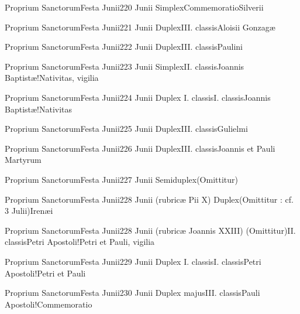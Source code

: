 \documentclass[invitatoriale-romanum.tex]{subfiles}
\begin{document}
	{Proprium Sanctorum}{Festa Junii}{2}{20 Junii}
	{Simplex}{Commemoratio}{Silverii}
	{}
	{\invitferia}

	{Proprium Sanctorum}{Festa Junii}{2}{21 Junii}
	{Duplex}{III. classis}{Aloisii Gonzagæ}
	{}
	{}

	{Proprium Sanctorum}{Festa Junii}{2}{22 Junii}
	{Duplex}{III. classis}{Paulini}
	{}
	{}

	{Proprium Sanctorum}{Festa Junii}{2}{23 Junii}
	{Simplex}{II. classis}{Joannis Baptistæ!Nativitas, vigilia}
	{}
	{}
\invitferia

	{Proprium Sanctorum}{Festa Junii}{2}{24 Junii}
	{Duplex I. classis}{I. classis}{Joannis Baptistæ!Nativitas}
	{}
	{}

	{Proprium Sanctorum}{Festa Junii}{2}{25 Junii}
	{Duplex}{III. classis}{Gulielmi}
	{}
	{}

	{Proprium Sanctorum}{Festa Junii}{2}{26 Junii}
	{Duplex}{III. classis}{Joannis et Pauli Martyrum}
	{}
	{}

	{Proprium Sanctorum}{Festa Junii}{2}{27 Junii}
	{Semiduplex}{(Omittitur)}{}
	{}
	{\invitferia}

	{Proprium Sanctorum}{Festa Junii}{2}{28 Junii (rubricæ Pii X)}
	{Duplex}{(Omittitur : cf. 3 Julii)}{Irenæi}
	{}
	{\invitferia}

	{Proprium Sanctorum}{Festa Junii}{2}{28 Junii (rubricæ Joannis XXIII)}
	{(Omittitur)}{II. classis}{Petri Apostoli!Petri et Pauli, vigilia}
	{}
	{\invitferia}

	{Proprium Sanctorum}{Festa Junii}{2}{29 Junii}
	{Duplex I. classis}{I. classis}{Petri Apostoli!Petri et Pauli}
	{}
	{}

	{Proprium Sanctorum}{Festa Junii}{2}{30 Junii}
	{Duplex majus}{III. classis}{Pauli Apostoli!Commemoratio}
	{}
	{}
\end{document}
